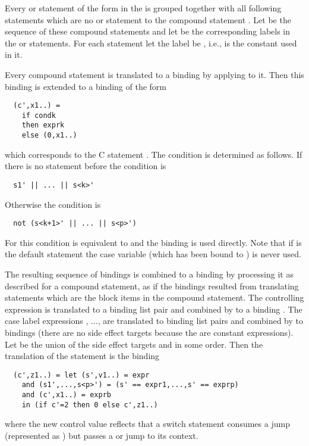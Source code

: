 Every  or  statement  of the form  in the  is grouped together with all 
following statements  which are no  or  statement to the compound statement .
Let  be the sequence of these compound statements and let  be the corresponding labels in the 
or  statements. For each  statement let the label  be , i.e.,  is the constant
used in it.

Every compound statement  is translated to a binding  by applying  to it. 
Then this binding is extended to a binding  of the form
\begin{verbatim}
  (c',x1..) = 
    if condk
    then exprk
    else (0,x1..)
\end{verbatim}
which corresponds to the C statement . The condition  is determined as follows.
If there is no  statement before  the condition is
\begin{verbatim}
  s1' || ... || s<k>'
\end{verbatim}
Otherwise the condition is
\begin{verbatim}
  not (s<k+1>' || ... || s<p>')
\end{verbatim}
For  this condition is equivalent to  and the binding  is used directly. Note that if
 is the default statement the case variable  (which has been bound to ) is never used.

The resulting sequence of bindings  is combined to a binding  by processing it as described 
for a compound statement, as if the bindings resulted from translating statements which are the block items in the compound 
statement. The controlling expression  is translated to a binding list pair and combined by  to a binding 
. The case label expressions , ...,  are translated to binding list pairs and combined by 
 to bindings  (there are no side effect targets because the  are constant expressions). 
Let  be the union of the side effect 
targets  and  in some order. Then the translation of the  statement is the binding
\begin{verbatim}
  (c',z1..) = let (s',v1..) = expr
    and (s1',...,s<p>') = (s' == expr1,...,s' == exprp)
    and (c',x1..) = exprb
    in (if c'=2 then 0 else c',z1..)
\end{verbatim}
where the new control value reflects that a switch statement consumes a  jump (represented as ) but passes a
 or  jump to its context.

